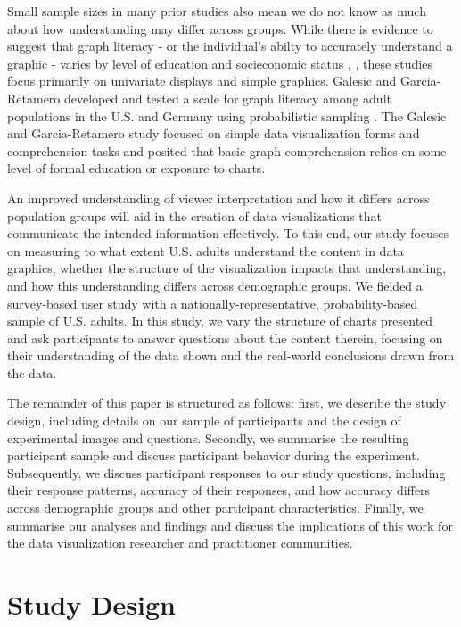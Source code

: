 \documentclass{IEEEcsmag}
\begin{document}
Small sample sizes in many prior studies also mean we do not know as much about how understanding may differ across groups. While there is evidence to suggest that graph literacy - or the individual's abilty to accurately understand a graphic - varies by level of education and socieconomic status , , these studies focus primarily on univariate displays and simple graphics. Galesic and Garcia-Retamero developed and tested a scale for graph literacy among adult populations in the U.S. and Germany using probabilistic sampling . The Galesic and Garcia-Retamero study focused on simple data visualization forms and comprehension tasks and posited that basic graph comprehension relies on some level of formal education or exposure to charts.

An improved understanding of viewer interpretation and how it differs across population groups will aid in the creation of data visualizations that communicate the intended information effectively. To this end, our study focuses on measuring to what extent U.S. adults understand the content in data graphics, whether the structure of the visualization impacts that understanding, and how this understanding differs across demographic groups. We fielded a survey-based user study with a nationally-representative, probability-based sample of U.S. adults. In this study, we vary the structure of charts presented and ask participants to answer questions about the content therein, focusing on their understanding of the data shown and the real-world conclusions drawn from the data.

The remainder of this paper is structured as follows: first, we describe the study design, including details on our sample of participants and the design of experimental images and questions. Secondly, we summarise the resulting participant sample and discuss participant behavior during the experiment. Subsequently, we discuss participant responses to our study questions, including their response patterns, accuracy of their responses, and how accuracy differs across demographic groups and other participant characteristics. Finally, we summarise our analyses and findings and discuss the implications of this work for the data visualization researcher and practitioner communities.

\section{Study Design}\label{design}
\end{document}
